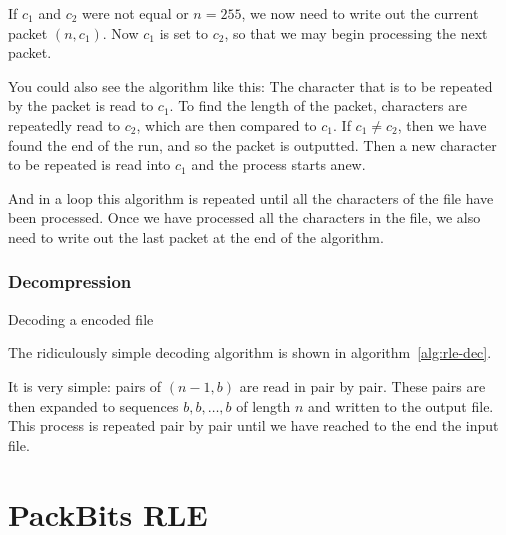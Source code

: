 If $c_1$ and $c_2$ were not equal or $n = 255$, we now need to write
out the current packet $(n,c_1)$. Now $c_1$ is set to $c_2$, so that
we may begin processing the next packet.

You could also see the algorithm like this: The character that is to
be repeated by the packet is read to $c_1$. To find the length of the
packet, characters are repeatedly read to $c_2$, which are then
compared to $c_1$. If $c_1 \neq c_2$, then we have found the end of
the run, and so the packet is outputted. Then a new character to be
repeated is read into $c_1$ and the process starts anew.

And in a loop this algorithm is repeated until all the characters of
the file have been processed. Once we have processed all the
characters in the file, we also need to write out the last packet at
the end of the algorithm.

\subsubsection{Decompression}

\begin{algorithm}
  \caption{Decoding a \rle encoded file}
  \label{alg:rle-dec}
  \begin{algorithmic}[1]


    \While{\neof}
    \State {}
    \EndRepeatn


    \EndWhile
  \end{algorithmic}
\end{algorithm}

The ridiculously simple \rle decoding algorithm is shown in
algorithm~\ref{alg:rle-dec}.

It is very simple: pairs of $(n-1,b)$ are read in pair by pair. These
pairs are then expanded to sequences $b,b,\dots,b$ of length $n$ and
written to the output file. This process is repeated pair by pair
until we have reached to the end the input file.

\section{PackBits RLE}
\label{sec:packbits-rle}

